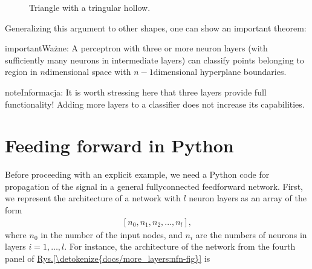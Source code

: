 \documentclass[a4paper,12pt,polish]{jupyterBook}
\let\sphinxpxdimen\pdfpxdimen\else\newdimen\sphinxpxdimen
\begin{document}
\begin{figure}[htbp]
\centering
\capstart

\noindent\sphinxincludegraphics[width=200\sphinxpxdimen]{{tritri}.png}
\caption{Triangle with a tringular hollow.}\label{\detokenize{docs/more_layers:tri-fig}}\end{figure}

\sphinxAtStartPar
Generalizing this argument to other shapes, one can show an important theorem:

\begin{sphinxadmonition}{important}{Ważne:}
\sphinxAtStartPar
A perceptron with three or more neuron layers (with sufficiently many neurons in intermediate layers) can classify points belonging to  region in \(n\)\sphinxhyphen{}dimensional space with \(n-1\)\sphinxhyphen{}dimensional hyperplane boundaries.
\end{sphinxadmonition}

\begin{sphinxadmonition}{note}{Informacja:}
\sphinxAtStartPar
It is worth stressing here that three layers provide full functionality! Adding more layers to a classifier does not increase its capabilities.
\end{sphinxadmonition}


\section{Feeding forward in Python}
\label{\detokenize{docs/more_layers:feeding-forward-in-python}}
\sphinxAtStartPar
Before proceeding with an explicit example, we need a Python code for propagation of the signal in a general fully\sphinxhyphen{}connected feed\sphinxhyphen{}forward network. First, we represent the architecture of a network with \(l\) neuron layers as an array of the form
\begin{equation*}
\begin{split}[n_0,n_1,n_2,...,n_l],\end{split}
\end{equation*}
\sphinxAtStartPar
where \(n_0\) in the number of the input nodes, and \(n_i\) are the numbers of neurons in layers \(i=1,\dots,l\). For instance, the architecture of the network from the fourth panel of \hyperref[\detokenize{docs/more_layers:nfn-fig}]{Rys.\@ \ref{\detokenize{docs/more_layers:nfn-fig}}} is
\begin{sphinxVerbatimInput}

\begin{sphinxVerbatim}[commandchars=\\\{\}]
\PYG{p}{[}\PYG{p}{]} 
\end{sphinxVerbatim}
\end{sphinxVerbatimInput}
\begin{sphinxVerbatimOutput}

\begin{sphinxVerbatim}[commandchars=\\\{\}]
[2, 4, 1]
\end{sphinxVerbatim}
\end{sphinxVerbatimOutput}
\end{document}
